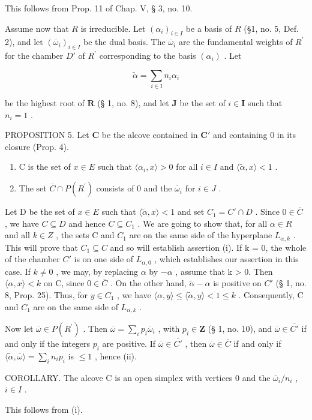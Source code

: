 This follows from Prop. 11 of Chap. V, § 3, no. 10.

Assume now that \(R\) is irreducible. Let \((\alpha_i)_{i\in I}\) be a basis of \(R\) (§1, no. 5, Def. 2), and let \((\overline{\omega}_i)_{i\in I}\) be the dual basis. The \(\overline{\omega}_i\) are the fundamental weights of \(R^{\prime}\) for the chamber \(D'\) of \(R^{\prime}\) corresponding to the basis \((\alpha_i)\) . Let

\[
\tilde {\alpha} = \sum_ {i \in \mathrm{I}} n _ {i} \alpha_ {i}
\]

be the highest root of \(\mathbf{R}\) (§ 1, no. 8), and let \(\mathbf{J}\) be the set of \(i \in \mathbf{I}\) such that \(n_i = 1\) .

PROPOSITION 5. Let \(\mathbf{C}\) be the alcove contained in \(\mathbf{C}'\) and containing 0 in its closure (Prop. 4).

\begin{enumerate}
\def\labelenumi{(\roman{enumi})}
\tightlist
\item
  C is the set of \(x \in E\) such that \(\langle\alpha_{i}, x\rangle > 0\) for all \(i \in I\) and \(\langle\tilde{\alpha}, x\rangle < 1\) .
\item
  The set \(\overline{C} \cap P(R^{\prime})\) consists of 0 and the \(\overline{\omega}_{i}\) for \(i \in J\) .
\end{enumerate}

Let D be the set of \(x \in E\) such that \(\langle\tilde{\alpha}, x\rangle < 1\) and set \(C_{1} = C' \cap D\) . Since \(0 \in \overline{C}\) , we have \(C \subseteq D\) and hence \(C \subseteq C_{1}\) . We are going to show that, for all \(\alpha \in R\) and all \(k \in Z\) , the sets C and \(C_{1}\) are on the same side of the hyperplane \(L_{\alpha,k}\) . This will prove that \(C_{1} \subseteq C\) and so will establish assertion (i). If k = 0, the whole of the chamber \(C'\) is on one side of \(L_{\alpha,0}\) , which establishes our assertion in this case. If \(k \neq 0\) , we may, by replacing \(\alpha\) by \(-\alpha\) , assume that k \textgreater{} 0. Then \(\langle\alpha, x\rangle < k\) on C, since \(0 \in \overline{C}\) . On the other hand, \(\tilde{\alpha} - \alpha\) is positive on \(C'\) (§ 1, no. 8, Prop. 25). Thus, for \(y \in C_{1}\) , we have \(\langle\alpha, y\rangle \leqslant \langle\tilde{\alpha}, y\rangle < 1 \leqslant k\) . Consequently, C and \(C_{1}\) are on the same side of \(L_{\alpha,k}\) .

Now let \(\overline{\omega} \in P(R^{\prime})\) . Then \(\overline{\omega} = \sum_{i} p_i \overline{\omega}_i\) , with \(p_i \in \mathbf{Z}\) (§ 1, no. 10), and \(\overline{\omega} \in \overline{C'}\) if and only if the integers \(p_i\) are positive. If \(\overline{\omega} \in \overline{C'}\) , then \(\overline{\omega} \in \overline{C}\) if and only if \(\langle \tilde{\alpha}, \overline{\omega} \rangle = \sum_{i} n_i p_i\) is \(\leqslant 1\) , hence (ii).

COROLLARY. The alcove C is an open simplex with vertices 0 and the \(\overline{\omega}_i / n_i\) , \(i \in I\) .

This follows from (i).


